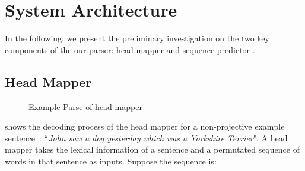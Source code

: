 \section{System Architecture}
In the following, we present the preliminary investigation on the two key
components of the our parser: head mapper and sequence predictor .

\subsection{Head Mapper}
\begin{figure*}[th]
\centering
{}
\caption{Example Parse of head mapper}
\label{fig:egparse}
\end{figure*}

 shows the decoding process of the head mapper
for a non-projective example sentence~\cite{mcdonald2005non}:
``\emph{John saw a dog yesterday which was a Yorkshire Terrier}".
A head mapper takes the lexical information of a sentence and
a permutated sequence of words in that sentence as inputs.
Suppose the sequence is: %

